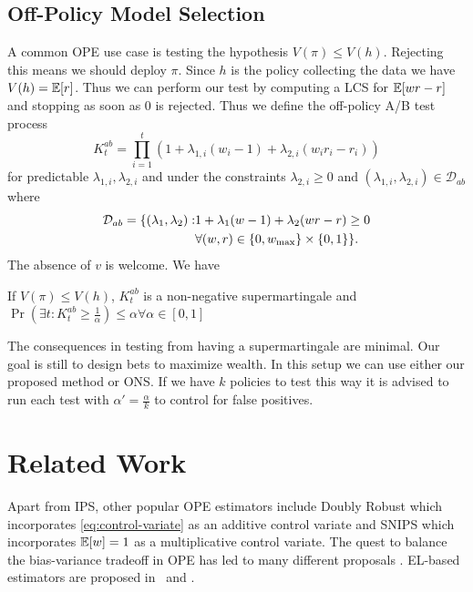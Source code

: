 \subsection{Off-Policy Model Selection}
A common OPE use case is testing the 
hypothesis $V(\pi)\leq V(h)$. Rejecting 
this means we should deploy $\pi$. Since
$h$ is the policy collecting the data we
have $V(h)=\mathbb{E}[r]$. Thus we can perform our 
test by computing a LCS for $\mathbb{E}[wr-r]$
and stopping as soon as 0 is rejected.
Thus we define the off-policy A/B test 
process
\[
K_t^{ab} = \prod_{i=1}^t \left(1+\lambda_{1,i} (w_i-1) + \lambda_{2,i}(w_ir_i -r_i)\right)  
\]
for predictable $\lambda_{1,i},\lambda_{2,i}$ and 
under the constraints $\lambda_{2,i} \geq 0$ and
$(\lambda_{1,i},\lambda_{2,i}) \in \mathcal{D}_{ab}$ where
\begin{align}
\mathcal{D}_{ab} = \{(\lambda_{1},\lambda_{2}): & 1+\lambda_1(w-1)+\lambda_2(wr-r)\geq 0 \notag\\
                         & \forall (w,r) \in \{0,w_{\max}\}\times \{0,1\}
\}.
\end{align}
The absence of $v$ is welcome. We have
\begin{theorem}
If $V(\pi)\leq V(h)$, $K_t^{ab}$ is a non-negative supermartingale and $\Pr\left(\exists t: K_t^{ab}\geq \frac{1}{\alpha}\right) \leq \alpha \forall \alpha \in [0,1]$ 
\end{theorem}
The consequences in testing from having a 
supermartingale are minimal. Our goal is 
still to design bets to maximize wealth.
In this setup we can use either our proposed 
method or ONS. If we have $k$ policies
to test this way it is advised to run 
each test with $\alpha'=\frac{\alpha}{k}$ 
to control for false positives.

\section{Related Work}
\label{sec:related}

Apart from IPS, other popular OPE estimators include
Doubly Robust \cite{RnR, dudik2011doubly} which 
incorporates \eqref{eq:control-variate}
as an additive control variate
and SNIPS \cite{swaminathan2015self} which incorporates $\mathbb{E}[w]=1$ 
as a multiplicative control variate. 
The quest to balance the bias-variance tradeoff in OPE
has led to many different proposals 
\cite{SWITCH, vlassis2019design}. %
EL-based estimators are proposed
in~\cite{kallus2019intrinsically} and \cite{karampatziakis2019empirical}.

